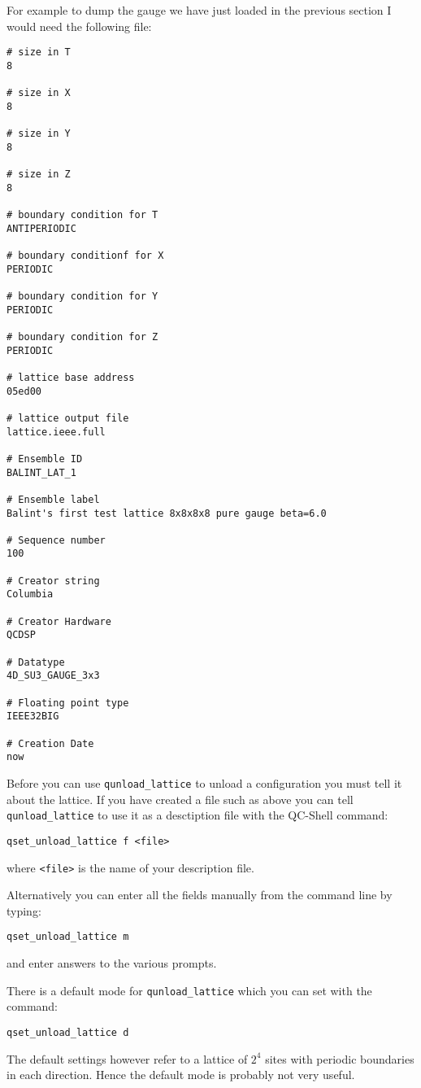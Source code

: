 For example to dump the gauge we have just loaded in the previous section
I would need the following file: 
\begin{verbatim}
# size in T
8

# size in X
8

# size in Y
8

# size in Z
8

# boundary condition for T
ANTIPERIODIC

# boundary conditionf for X
PERIODIC

# boundary condition for Y
PERIODIC

# boundary condition for Z
PERIODIC

# lattice base address
05ed00

# lattice output file
lattice.ieee.full

# Ensemble ID
BALINT_LAT_1

# Ensemble label
Balint's first test lattice 8x8x8x8 pure gauge beta=6.0

# Sequence number 
100

# Creator string 
Columbia

# Creator Hardware 
QCDSP 

# Datatype 
4D_SU3_GAUGE_3x3

# Floating point type
IEEE32BIG

# Creation Date 
now
\end{verbatim}

Before you can use {\tt qunload\_lattice} to unload a configuration
you must tell it about the lattice. If you have created a file such as
above you can tell {\tt qunload\_lattice} to use it as a desctiption file
with the QC-Shell command:
\begin{verbatim}
qset_unload_lattice f <file>
\end{verbatim}
where {\tt <file>} is the name of your description file.

Alternatively you can enter all the fields manually from the command 
line by typing:
\begin{verbatim}
qset_unload_lattice m
\end{verbatim}
and enter answers to the various prompts.

There is a default mode for {\tt qunload\_lattice} which you 
can set with the command:
\begin{verbatim}
qset_unload_lattice d
\end{verbatim}
The default settings however refer to a lattice of $2^4$ sites with 
periodic boundaries in each direction. Hence the default mode is probably
not very useful.

